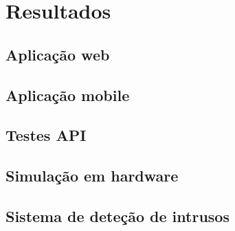 \chapter{Resultados}





\section{Aplicação web}

\section{Aplicação mobile}


\section{Testes API}


\section{Simulação em hardware}


\section{Sistema de deteção de intrusos}

